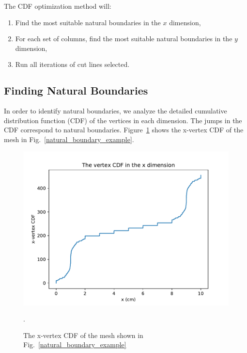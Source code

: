 The CDF optimization method will:
\begin{enumerate}
  \item Find the most suitable natural boundaries in the $x$ dimension,
  \item For each set of columns, find the most suitable natural boundaries in the $y$ dimension,
  \item Run all iterations of cut lines selected.
\end{enumerate}

\subsection{Finding Natural Boundaries}

In order to identify natural boundaries, we analyze the detailed cumulative distribution function (CDF) of the vertices in each dimension. The jumps in the CDF correspond to natural boundaries. Figure~\ref{vert_cdf} shows the x-vertex CDF of the mesh in Fig.~\ref{natural_boundary_example}.
\begin{figure}[h]
\centering
\includegraphics[scale=0.75]{../figures/xvertexcdf.pdf}
\caption{The x-vertex CDF of the mesh shown in Fig.~\ref{natural_boundary_example}}.
\label{vert_cdf}
\end{figure}

